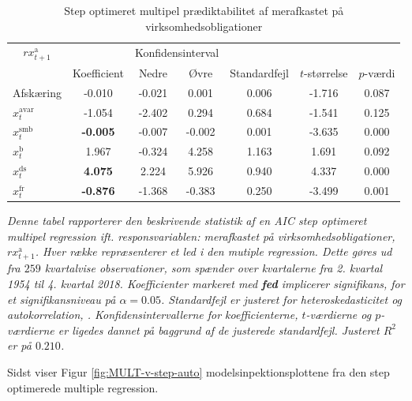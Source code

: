 \documentclass[
  a4paper,
  oneside]{memoir}
\begin{document}
\begin{table}[H]

\caption{\label{tab:MULT-step-v}Step optimeret multipel prædiktabilitet af merafkastet på virksomhedsobligationer}
\centering
\begin{threeparttable}
\begin{tabular}[t]{lcccccc}
\toprule
\multicolumn{1}{c}{$rx_{t+1}^{\text{a}}$} & \multicolumn{1}{c}{ } & \multicolumn{2}{c}{Konfidensinterval} & \multicolumn{3}{c}{ } \\
\cmidrule(l{3pt}r{3pt}){1-1} \cmidrule(l{3pt}r{3pt}){3-4}
  & Koefficient & Nedre & Øvre & Standardfejl & $t$-størrelse & $p$-værdi\\
\midrule
\rowcolor{gray!6}  Afskæring & -0.010 & -0.021 & 0.001 & 0.006 & -1.716 & 0.087\\
$x_t^{\text{avar}}$ & -1.054 & -2.402 & 0.294 & 0.684 & -1.541 & 0.125\\
\rowcolor{gray!6}  $x_t^{\text{smb}}$ & \textbf{-0.005} & -0.007 & -0.002 & 0.001 & -3.635 & 0.000\\
$x_t^{\text{b}}$ & 1.967 & -0.324 & 4.258 & 1.163 & 1.691 & 0.092\\
\rowcolor{gray!6}  $x_t^{\text{ds}}$ & \textbf{ 4.075} & 2.224 & 5.926 & 0.940 & 4.337 & 0.000\\
$x_t^{\text{fr}}$ & \textbf{-0.876} & -1.368 & -0.383 & 0.250 & -3.499 & 0.001\\
\bottomrule
\end{tabular}
\begin{tablenotes}
\item \textit{Denne tabel rapporterer den beskrivende statistik af en AIC step optimeret multipel regression ift. responsvariablen: merafkastet på virksomhedsobligationer, $rx_{t+1}^{\text{a}}$. Hver række repræsenterer et led i den mutiple regression. Dette gøres ud fra $259$ kvartalvise observationer, som spænder over kvartalerne fra 2. kvartal 1954 til 4. kvartal 2018. Koefficienter markeret med \textbf{fed} implicerer signifikans, for et signifikansniveau på $\alpha=0.05$. Standardfejl er justeret for heteroskedasticitet og autokorrelation, \citep{Newey1987}. Konfidensintervallerne for koefficienterne, $t$-værdierne og $p$-værdierne er ligedes dannet på baggrund af de justerede standardfejl. Justeret $R^2$ er på $0.210$.}
\end{tablenotes}
\end{threeparttable}
\end{table}

Sidst viser Figur \ref{fig:MULT-v-step-auto} modelsinpektionsplottene fra den step optimerede multiple regression.
\end{document}
